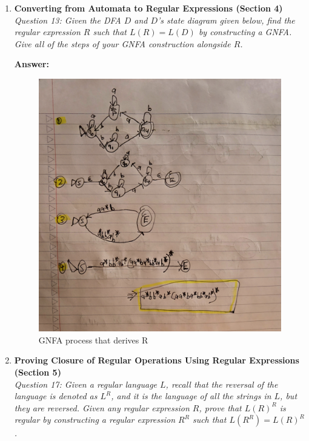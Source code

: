 \documentclass[10pt,letterpaper,unboxed,cm]{article}
\begin{document}
\begin{enumerate}
\pagebreak 

\item \textbf{Converting from Automata to Regular Expressions (Section 4)} \\
\emph{Question 13: Given the DFA $D$ and $D$'s state diagram given below, find the regular expression $R$ such that $L(R)=L(D)$ by constructing a GNFA. Give all of the steps of your GNFA construction alongside $R$.}


\textbf{Answer: } \newline 

\begin{figure}[h!]
  \centering
  \includegraphics[width=0.8\linewidth]{images/hw3q13.png}
  \caption{GNFA process that derives R}
  \label{fig:my_image}
\end{figure}


\pagebreak

\item \textbf{Proving Closure of Regular Operations Using Regular Expressions (Section 5)} \\
\emph{Question 17: Given a regular language $L$, recall that the reversal of the language is denoted as $L^R$, and it is the language of all the strings in $L$, but they are reversed. Given any regular expression $R$, prove that $L(R)^R$ is regular by constructing a regular expression $R^R$ such that $L(R^R) = L(R)^R$.}


\end{enumerate}
\end{document}
